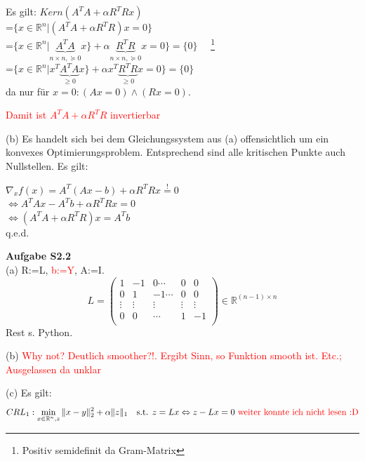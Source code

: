 \documentclass[ngerman, a4paper,12pt]{article}
\begin{document}

Es gilt: $Kern(A^TA+\alpha R^TRx)$\\[10pt]
=$\{x\in\mathbb R^n|(A^TA+\alpha R^TR)x=0\}$\\[10pt]
=$\{x\in \mathbb R^n|\underbrace{A^TA}_{n\times n,\succeq 0}x\}+\alpha\underbrace{R^TR}_{n\times n,\succeq 0}x=0\}=\{0\}\quad$ \footnote{Positiv semidefinit da Gram-Matrix}\\[10pt]
=$\{x\in \mathbb R^n|x^T\underbrace{A^TA}_{\geq 0}x\}+\alpha x^T\underbrace{R^TR}_{\geq 0}x=0\}=\{0\}$\\[10pt]
da nur für $x=0:(Ax=0)\wedge (Rx=0)$.

\textcolor{red}{Damit ist $A^TA+\alpha R^TR$ invertierbar}

\par
(b) Es handelt sich bei dem Gleichungssystem aus (a) offensichtlich um ein konvexes Optimierungsproblem.
Entsprechend sind alle kritischen Punkte auch Nullstellen.
Es gilt:

$\nabla_x f(x)=A^T(Ax-b)+\alpha R^TRx\stackrel{!}{=}0$\\[5pt]
$\Leftrightarrow A^TAx-A^Tb+\alpha R^TRx=0$\\[5pt]
$\Leftrightarrow (A^TA+\alpha R^TR)x=A^Tb$\\[5pt]
q.e.d.
\par



\textbf{Aufgabe S2.2} \\

(a) R:=L, \textcolor{red}{b:=Y}, A:=I.
\begin{equation*}
	L = \begin{pmatrix}
	1 &-1 & 0 \cdots &0 &0\\
	0 & 1 & -1 \cdots &0 &0\\
	\vdots & \vdots & \vdots & \vdots & \vdots \\
	0 & 0 & \cdots & 1 & -1\\ 
	\end{pmatrix} \in \mathbb R^{(n-1)\times n}
\end{equation*}
Rest s. Python.

\par
(b) \textcolor{red}{Why not? Deutlich smoother?!. Ergibt Sinn, so Funktion smooth ist. Etc.; Ausgelassen da unklar}

\par
(c) Es gilt:\\[10pt]
\begin{equation*}	
CRL_1: \min_{x\in\mathbb R^n,z}\|x-y\|_2^2+\alpha\|z\|_1\quad \text{s.t. $z=Lx \Leftrightarrow z-Lx=0$  \textcolor{red}{weiter konnte ich nicht lesen :D}}
\end{equation*}
\end{document}
